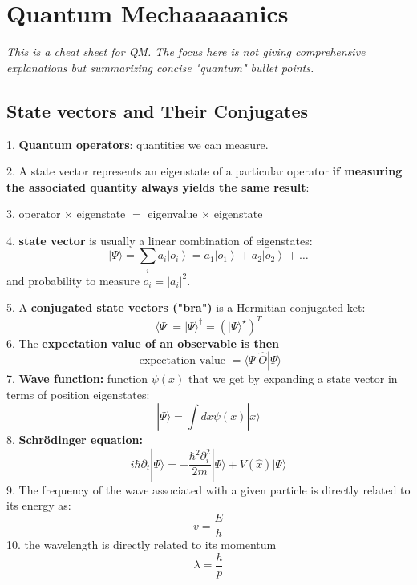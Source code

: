 \chapter{Quantum Mechaaaaanics}
\textit{This is a cheat sheet for QM. The focus here is not giving comprehensive explanations but summarizing concise "quantum" bullet points.}

\section{State vectors and Their Conjugates}
1. \textbf{Quantum operators}: quantities we can measure.

2. A state vector represents an eigenstate of a particular operator \textbf{if measuring the associated quantity always yields the same result}:

3. operator $\times$ eigenstate $=$ eigenvalue $\times$ eigenstate

4. \textbf{state vector} is usually a linear combination of eigenstates:
$$
|\Psi\rangle=\sum_{i} a_{i}\left|o_{i}\right\rangle= a_{1}\left|o_{1}\right\rangle+ a_{2}\left|o_{2}\right\rangle+\dots
$$
and probability to measure $o_{i}=\left|a_{i}\right|^{2}$.

5. A \textbf{conjugated state vectors ("bra")} is a Hermitian conjugated ket:
$$
\langle\Psi|=| \Psi\rangle^{\dagger}=\left(|\Psi\rangle^{\star}\right)^{T}
$$
6. The \textbf{expectation value of an observable is then}
\begin{equation}
\text { expectation value }=\langle\Psi|\hat{O}| \Psi\rangle
\label{expectation}
\end{equation}
7. \textbf{Wave function:} function $\psi(x)$ that we get by expanding a state vector in terms of position eigenstates:
\begin{equation}
|\Psi\rangle=\int d x \psi(x)|x\rangle
\end{equation}
8. \textbf{Schrödinger equation:}
\begin{equation}
i \hbar \partial_{t}|\Psi\rangle=-\frac{\hbar^{2} \partial_{i}^{2}}{2 m}|\Psi\rangle+ V(\hat{x})|\Psi\rangle
\end{equation}
9. The frequency of the wave associated with a given particle is directly related to its energy as:
\begin{equation}
v=\frac{E}{h}
\end{equation}
10. the wavelength is directly related to its momentum 
\begin{equation}
\lambda=\frac{h}{p}
\end{equation}

